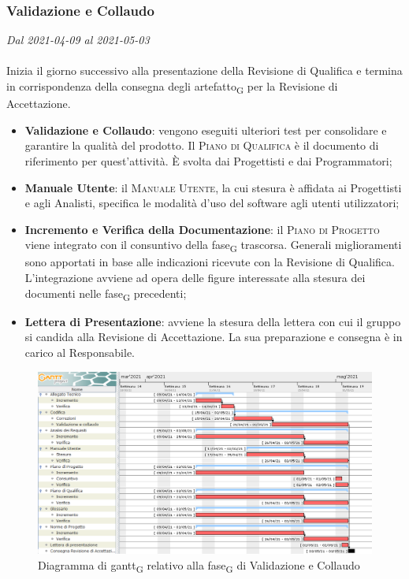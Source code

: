 \subsubsection{Validazione e Collaudo}

\textit{Dal 2021-04-09 al 2021-05-03}
\\\\
Inizia il giorno successivo alla presentazione della Revisione di Qualifica e termina in corrispondenza della consegna degli artefatto\textsubscript{G} per la Revisione di Accettazione.
\begin{itemize}
	\item \textbf{Validazione e Collaudo}: vengono eseguiti ulteriori test per consolidare e garantire la qualità del prodotto. Il \textsc{Piano di Qualifica} è il documento di riferimento per quest'attività. \`E svolta dai Progettisti e dai Programmatori;
	\item \textbf{Manuale Utente}: il \textsc{Manuale Utente}, la cui stesura è affidata ai Progettisti e agli Analisti, specifica le modalità d'uso del software agli utenti utilizzatori;
	\item \textbf{Incremento e Verifica della Documentazione}: il \textsc{Piano di Progetto} viene integrato con il consuntivo della fase\textsubscript{G} trascorsa. Generali miglioramenti sono apportati in base alle indicazioni ricevute con la Revisione di Qualifica. L'integrazione avviene ad opera delle figure interessate alla stesura dei documenti nelle fase\textsubscript{G} precedenti;
	\item \textbf{Lettera di Presentazione}: avviene la stesura della lettera con cui il gruppo si candida alla Revisione di Accettazione. La sua preparazione e consegna è in carico al Responsabile.
\end{itemize}

\begin{figure}[H]
	\centering
	\includegraphics[scale=0.51]{res/images/06_gantt_validazione}
	\caption{Diagramma di gantt\textsubscript{G} relativo alla fase\textsubscript{G} di Validazione e Collaudo}
\end{figure}